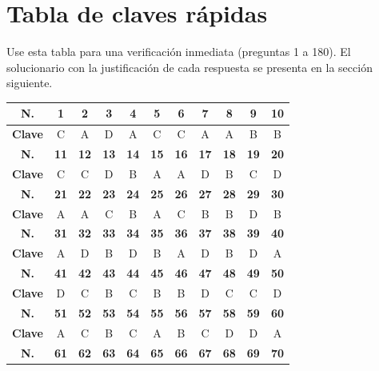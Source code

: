 \newpage
\section*{Tabla de claves rápidas}

\noindent Use esta tabla para una verificación inmediata (preguntas 1 a 180). El solucionario con la justificación de cada respuesta se presenta en la sección siguiente.

\vspace{0.35cm}
\begin{center}
\footnotesize
\renewcommand{\arraystretch}{1.25}
\begin{tabular}{|c|c|c|c|c|c|c|c|c|c|c|}
\hline
\textbf{N.} & \textbf{1} & \textbf{2} & \textbf{3} & \textbf{4} & \textbf{5} & \textbf{6} & \textbf{7} & \textbf{8} & \textbf{9} & \textbf{10} \\
\hline
\textbf{Clave} & C & A & D & A & C & C & A & A & B & B \\
\hline
\textbf{N.} & \textbf{11} & \textbf{12} & \textbf{13} & \textbf{14} & \textbf{15} & \textbf{16} & \textbf{17} & \textbf{18} & \textbf{19} & \textbf{20} \\
\hline
\textbf{Clave} & C & C & D & B & A & A & D & B & C & D \\
\hline
\textbf{N.} & \textbf{21} & \textbf{22} & \textbf{23} & \textbf{24} & \textbf{25} & \textbf{26} & \textbf{27} & \textbf{28} & \textbf{29} & \textbf{30} \\
\hline
\textbf{Clave} & A & A & C & B & A & C & B & B & D & B \\
\hline
\textbf{N.} & \textbf{31} & \textbf{32} & \textbf{33} & \textbf{34} & \textbf{35} & \textbf{36} & \textbf{37} & \textbf{38} & \textbf{39} & \textbf{40} \\
\hline
\textbf{Clave} & A & D & B & D & B & A & D & B & D & A \\
\hline
\textbf{N.} & \textbf{41} & \textbf{42} & \textbf{43} & \textbf{44} & \textbf{45} & \textbf{46} & \textbf{47} & \textbf{48} & \textbf{49} & \textbf{50} \\
\hline
\textbf{Clave} & D & C & B & C & B & B & D & C & C & D \\
\hline
\textbf{N.} & \textbf{51} & \textbf{52} & \textbf{53} & \textbf{54} & \textbf{55} & \textbf{56} & \textbf{57} & \textbf{58} & \textbf{59} & \textbf{60} \\
\hline
\textbf{Clave} & A & C & B & C & A & B & C & D & D & A \\
\hline
\textbf{N.} & \textbf{61} & \textbf{62} & \textbf{63} & \textbf{64} & \textbf{65} & \textbf{66} & \textbf{67} & \textbf{68} & \textbf{69} & \textbf{70} \\

\end{tabular}
\end{center}
